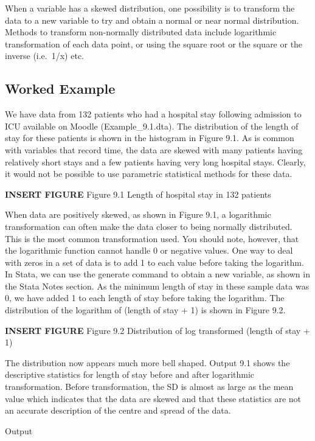 \documentclass[
]{memoir}
\begin{document}
When a variable has a skewed distribution, one possibility is to transform the data to a new variable to try and obtain a normal or near normal distribution. Methods to transform non-normally distributed data include logarithmic transformation of each data point, or using the square root or the square or the inverse (i.e.~1/x) etc.

\hypertarget{worked-example-5}{%
\subsection{Worked Example}\label{worked-example-5}}

We have data from 132 patients who had a hospital stay following admission to ICU available on Moodle (Example\_9.1.dta). The distribution of the length of stay for these patients is shown in the histogram in Figure 9.1. As is common with variables that record time, the data are skewed with many patients having relatively short stays and a few patients having very long hospital stays. Clearly, it would not be possible to use parametric statistical methods for these data.

\textbf{INSERT FIGURE}
Figure 9.1 Length of hospital stay in 132 patients

When data are positively skewed, as shown in Figure 9.1, a logarithmic transformation can often make the data closer to being normally distributed. This is the most common transformation used. You should note, however, that the logarithmic function cannot handle 0 or negative values. One way to deal with zeros in a set of data is to add 1 to each value before taking the logarithm.
In Stata, we can use the generate command to obtain a new variable, as shown in the Stata Notes section. As the minimum length of stay in these sample data was 0, we have added 1 to each length of stay before taking the logarithm. The distribution of the logarithm of (length of stay + 1) is shown in Figure 9.2.

\textbf{INSERT FIGURE}
Figure 9.2 Distribution of log transformed (length of stay + 1)

The distribution now appears much more bell shaped. Output 9.1 shows the descriptive statistics for length of stay before and after logarithmic transformation. Before transformation, the SD is almost as large as the mean value which indicates that the data are skewed and that these statistics are not an accurate description of the centre and spread of the data.

Output
\end{document}
